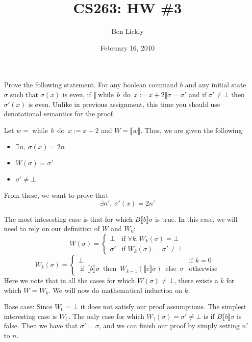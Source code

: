 \documentclass{article}
\title{CS263: HW \#3}
\author{Ben Lickly}
\date{February 16, 2010}
\newcommand{\problem}[1]
{\subsubsection*{} %
\vspace{-16pt} \section{} \vspace{-22pt} \qquad
#1%
\bigskip \bigskip
}
\newcommand{\while}[2]{\operatorname{while}\, #1\ \operatorname{do}\ #2}
\newcommand{\ifthen}[3]{\operatorname{if}\, #1
\ \operatorname{then}\ #2\ \operatorname{else}\ #3}
\newcommand{\denote}[1]{\llbracket #1 \rrbracket}
\begin{document}
\maketitle
\problem{
Prove the following statement. For any boolean command $b$ and any initial state
$\sigma$ such that $\sigma(x)$ is even, if $\denote{\while{b}{x := x + 2}}
\sigma = \sigma'$ and if $\sigma' \ne \bot$ then $\sigma'(x)$ is even. Unlike in
previous assignment, this time you should use denotational semantics for the proof.
}

Let $w = \while{b}{x := x +2}$ and $W = \denote{w}$.
%
Thus, we are given the following:
\begin{itemize}
  \item $\exists n,\ \sigma(x) = 2n$
  \item $W(\sigma) = \sigma'$
  \item $\sigma' \ne \bot$
\end{itemize}
From these, we want to prove that
\[
\exists n',\ \sigma'(x) = 2n'
\]

\iffalse
Case: the rule at the root is while-false

\[
W_k(\sigma) = \ifthen{\denote{b}\sigma}{W_{k-1}(\denote{c}\sigma)}{\sigma}
\]
\[
W(\sigma) = \ifthen{\denote{b}\sigma}{W(\denote{c}\sigma)}{\sigma}
\]
\fi

The most intesesting case is that for which $B\denote{b}\sigma$ is true.
In this case, we will need to rely on our definition of $W$ and $W_k$:
\[
W(\sigma) = \begin{cases}
            \bot    &\text{if } \forall k, W_k(\sigma) = \bot \\
            \sigma' &\text{if } W_k(\sigma) = \sigma' \ne \bot
            \end{cases}
\]
\[
W_k(\sigma) =
\begin{cases}
\bot & \text{if } k = 0 \\
\ifthen{\denote{b}\sigma}{W_{k-1}(\denote{c}\sigma)}{\sigma} &\text{otherwise}
\end{cases}
\]
Here we note that in all the cases for which $W(\sigma) \ne \bot$, there exists
a $k$ for which $W = W_k$.  We will now do mathematical induction on $k$.

Base case: Since $W_0 = \bot$ it does not satisfy our proof assumptions.
The simplest interesting case is $W_1$.  The only case for which $W_1(\sigma) =
\sigma' \ne \bot$ is if $B\denote{b}\sigma$ is false.  Then we have that
$\sigma' = \sigma$, and we can finish our proof by simply setting $n'$ to $n$.
\end{document}
